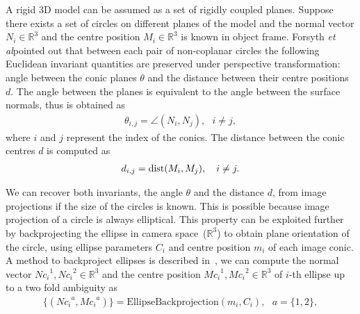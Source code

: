 \documentclass{bmvc2k}
\newcommand{\revise}[2]{\textcolor{red}{\sout{#1}} \textcolor{blue}{#2}}  %
\def\etal{\emph{et al}\bmvaOneDot}
\begin{document}
\par 
A rigid 3D model can be assumed as a set of rigidly coupled planes.
Suppose there exists a set of circles on different planes of the model and the normal vector $N_i \in \mathbb{R}^3$ and the centre position $M_i \in \mathbb{R}^3$ is known in object frame.
Forsyth \etal pointed out that between each pair of non-coplanar circles the following Euclidean invariant quantities are preserved under perspective transformation: angle between the conic planes $ \theta $ and the distance between their centre positions $ d $.
The angle between the planes is equivalent to the angle between the surface normals, thus is obtained as
\begin{align}
\theta_{i,j} = \angle(N_i,N_j),~~~i \neq j,
\label{eq:invTheta3d}
\end{align}
where $i$ and $j$ represent the index of the conics.
The distance between the conic centres $d$ is computed as
\begin{align}
d_{i,j} = {\rm dist}(M_i,M_j),~~~i \neq j.
\label{eq:invD3d}
\end{align} 
\par
We can recover both invariants, the angle $\theta$ and the distance $d$, from image projections if the size of the circles is known.
This is possible because image projection of a circle is always elliptical. 
This property can be exploited further by backprojecting the ellipse in camera space~($\mathbb{R}^3 $) to obtain plane orientation of the circle, using ellipse parameters $C_i$ and centre position $m_i$ of each image conic.
A method to backproject ellipses is described in~\cite{forsyth_91}, we can compute the normal vector ${Nc_i}^1,{Nc_i}^2 \in \mathbb{R}^3$ and the centre position ${Mc_i}^1, {Mc_i}^2 \in \mathbb{R}^3$ of $i$-th ellipse up to a two fold ambiguity as
\begin{align} \label{Eq:Backprojection}
\{ ( {Nc_i}^a,{Mc_i}^a ) \} = \text{EllipseBackprojection}(m_i,C_i),~~~ a = \{1,2\}, %
\end{align}
\end{document}
